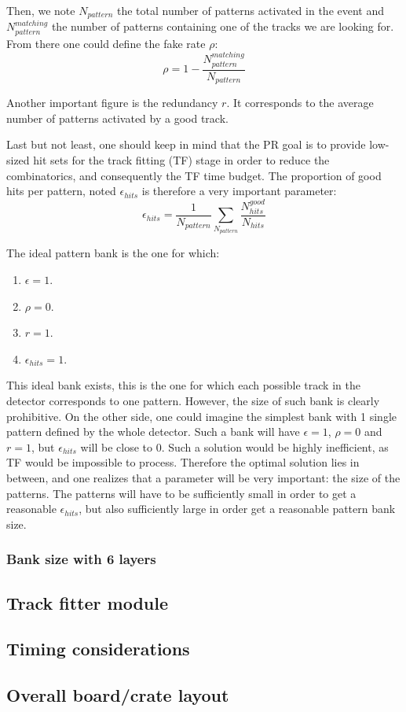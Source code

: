 \noindent Then, we note $N_{pattern}$ the total number of patterns activated in the event and $N^{matching}_{pattern}$ the number of patterns containing one of the tracks we are looking for. From there one could define the fake rate $\rho$:
\begin{equation}
\rho = 1 - \frac{N^{matching}_{pattern}}{N_{pattern}}
\end{equation} 

\noindent Another important figure is the redundancy $r$. It corresponds to the average number of patterns activated by a good track. 

\noindent Last but not least, one should keep in mind that the PR goal is to provide low-sized hit sets for the track fitting (TF) stage in order to reduce the combinatorics, and consequently the TF time budget. The proportion of good hits per pattern, noted $\epsilon_{hits}$ is therefore a very important parameter:
\begin{equation}
\epsilon_{hits} = \frac{1}{N_{pattern}}\sum_{N_{pattern}}\frac{N_{hits}^{good}}{N_{hits}}
\end{equation} 

\noindent The ideal pattern bank is the one for which:  
\begin{enumerate}
\item $\epsilon = 1$.
\item $\rho = 0$.
\item $r = 1$.
\item $\epsilon_{hits} = 1$. 
\end{enumerate}  

\noindent This ideal bank exists, this is the one for which each possible track in the detector corresponds to one pattern. However, the size of such bank is clearly prohibitive. On the other side, one could imagine the simplest bank with 1 single pattern defined by the whole detector. Such a bank will have $\epsilon=1$, $\rho = 0$ and $r = 1$, but $\epsilon_{hits}$ will be close to 0. Such a solution would be highly inefficient, as TF would be impossible to process. Therefore the optimal solution lies in between, and one realizes that a parameter will be very important: the size of the patterns. The patterns will have to be sufficiently small in order to get a reasonable $\epsilon_{hits}$, but also sufficiently large in order get a reasonable pattern bank size. 

\subsubsection{Bank size with 6 layers}

\subsection{Track fitter module}

\subsection{Timing considerations}

\subsection{Overall board/crate layout}


\clearpage
